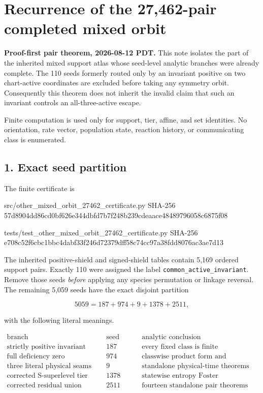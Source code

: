 \section{Recurrence of the 27,462-pair completed mixed
orbit}

\textbf{Proof-first pair theorem, 2026-08-12 PDT.} This note isolates
the part of the inherited mixed support atlas whose seed-level analytic
branches were already complete. The 110 seeds formerly routed only by an
invariant positive on two chart-active coordinates are excluded before
taking any symmetry orbit. Consequently this theorem does not inherit
the invalid claim that such an invariant controls an all-three-active
escape.

Finite computation is used only for support, tier, affine, and set
identities. No orientation, rate vector, population state, reaction
history, or communicating class is enumerated.

\subsection{1. Exact seed partition}

The finite certificate is

\begin{CodeBlock}
src/other_mixed_orbit_27462_certificate.py
SHA-256 57d8904dd86cd0bf626e344dbfd7b7f248b239cdeaace48489796058c6875f08

tests/test_other_mixed_orbit_27462_certificate.py
SHA-256 e708c52f6cbc1bbc4dabf33f246d72379dff58c74cc97a38fdd8076ac3ae7d13
\end{CodeBlock}

The inherited positive-shield and signed-shield tables contain 5,169
ordered support pairs. Exactly 110 were assigned the label
\texttt{common\_active\_invariant}. Remove those seeds \emph{before}
applying any species permutation or linkage reversal. The remaining
5,059 seeds have the exact disjoint partition

\[
 5059=187+974+9+1378+2511,                              \tag{1.1}
\]

with the following literal meanings.

\[
\begin{array}{l|r|l}
\text{branch}&\text{seed pairs}&\text{analytic conclusion}\\ \hline
\text{strictly positive invariant}&187&\text{every fixed class is finite}\\
\text{full deficiency zero}&974&\text{classwise product form and recurrence}\\
\text{three literal physical seams}&9&\text{standalone physical-time theorems}\\
\text{corrected S-superlevel tier pass}&1378&\text{statewise entropy Foster}\\
\text{corrected residual union}&2511&\text{fourteen standalone pair theorems}
\end{array}                                               \tag{1.2}
\]

